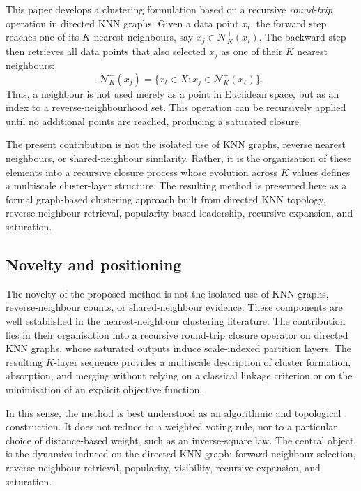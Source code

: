 \documentclass[pdflatex,sn-mathphys-num]{sn-jnl}
\newcommand{\calN}{\mathcal{N}}
\begin{document}
This paper develops a clustering formulation based on a recursive \emph{round-trip} operation in directed KNN graphs. Given a data point $x_i$, the forward step reaches one of its $K$ nearest neighbours, say $x_j\in\calN_K^+(x_i)$. The backward step then retrieves all data points that also selected $x_j$ as one of their $K$ nearest neighbours:
\begin{equation}
\calN_K^-(x_j)=\{x_\ell\in X: x_j\in\calN_K^+(x_\ell)\}.
\end{equation}
Thus, a neighbour is not used merely as a point in Euclidean space, but as an index to a reverse-neighbourhood set. This operation can be recursively applied until no additional points are reached, producing a saturated closure.

The present contribution is not the isolated use of KNN graphs, reverse nearest neighbours, or shared-neighbour similarity. Rather, it is the organisation of these elements into a recursive closure process whose evolution across $K$ values defines a multiscale cluster-layer structure. The resulting method is presented here as a formal graph-based clustering approach built from directed KNN topology, reverse-neighbour retrieval, popularity-based leadership, recursive expansion, and saturation.

\subsection{Novelty and positioning}

The novelty of the proposed method is not the isolated use of KNN graphs, reverse-neighbour counts, or shared-neighbour evidence. These components are well established in the nearest-neighbour clustering literature. The contribution lies in their organisation into a recursive round-trip closure operator on directed KNN graphs, whose saturated outputs induce scale-indexed partition layers. The resulting $K$-layer sequence provides a multiscale description of cluster formation, absorption, and merging without relying on a classical linkage criterion or on the minimisation of an explicit objective function.

In this sense, the method is best understood as an algorithmic and topological construction. It does not reduce to a weighted voting rule, nor to a particular choice of distance-based weight, such as an inverse-square law. The central object is the dynamics induced on the directed KNN graph: forward-neighbour selection, reverse-neighbour retrieval, popularity, visibility, recursive expansion, and saturation.
\end{document}
